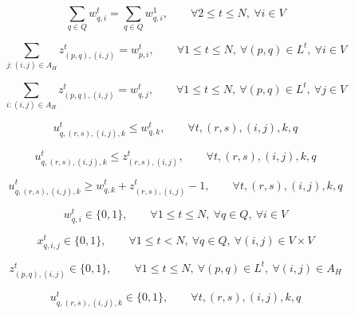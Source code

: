 \documentclass[10pt]{article}
\begin{document}
\begin{equation}
\sum_{q\in Q} w_{q,i}^t = \sum_{q\in Q} w_{q,i}^1,
\qquad
\forall 2 \le t \le N,\ \forall i \in V
\tag{1j}
\end{equation}

\begin{equation}
\sum_{j:(i,j)\in A_H} z_{(p,q),(i,j)}^t = w_{p,i}^t,
\qquad
\forall 1 \le t \le N,\ \forall (p,q) \in L^t,\ \forall i \in V
\tag{2a}
\end{equation}

\begin{equation}
\sum_{i:(i,j)\in A_H} z_{(p,q),(i,j)}^t = w_{q,j}^t,
\qquad
\forall 1 \le t \le N,\ \forall (p,q) \in L^t,\ \forall j \in V
\tag{2b}
\end{equation}

\begin{equation}
u_{q,(r,s),(i,j),k}^t \le w_{q,k}^t,
\qquad
\forall t,(r,s),(i,j),k,q
\tag{2c}
\end{equation}

\begin{equation}
u_{q,(r,s),(i,j),k}^t \le z_{(r,s),(i,j)}^t,
\qquad
\forall t,(r,s),(i,j),k,q
\tag{2d}
\end{equation}

\begin{equation}
u_{q,(r,s),(i,j),k}^t \ge w_{q,k}^t + z_{(r,s),(i,j)}^t - 1,
\qquad
\forall t,(r,s),(i,j),k,q
\tag{2e}
\end{equation}

\begin{equation}
w_{q,i}^t \in \{0,1\},
\qquad
\forall 1 \le t \le N,\ \forall q \in Q,\ \forall i \in V
\tag{3a}
\end{equation}

\begin{equation}
x_{q,i,j}^t \in \{0,1\},
\qquad
\forall 1 \le t < N,\ \forall q \in Q,\ \forall (i,j) \in V \times V
\tag{3b}
\end{equation}

\begin{equation}
z_{(p,q),(i,j)}^t \in \{0,1\},
\qquad
\forall 1 \le t \le N,\ \forall (p,q) \in L^t,\ \forall (i,j) \in A_H
\tag{3c}
\end{equation}

\begin{equation}
u_{q,(r,s),(i,j),k}^t \in \{0,1\},
\qquad
\forall t,(r,s),(i,j),k,q
\tag{3d}
\end{equation}
\end{document}
